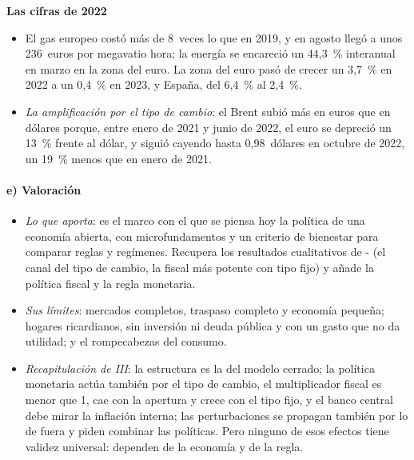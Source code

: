 \documentclass[11pt]{article}
\begin{document}
\begin{anotaciones}
\textbf{Las cifras de 2022}
\begin{itemize}
\item El gas europeo costó más de 8~veces lo que en 2019, y en agosto llegó a unos 236~euros por megavatio hora\nocite{BancoMundial2026PinkSheet}; la energía se encareció un 44,3~\% interanual en marzo en la zona del euro\nocite{Eurostat2026IAPC}. La zona del euro pasó de crecer un 3,7~\% en 2022 a un 0,4~\% en 2023, y España, del 6,4~\% al 2,4~\%\nocite{Eurostat2026nama10gdp,INE2026CNA2025}.
\item \emph{La amplificación por el tipo de cambio}: el Brent subió más en euros que en dólares\nocite{EIA2026Brent} porque, entre enero de 2021 y junio de 2022, el euro se depreció un 13~\% frente al dólar, y siguió cayendo hasta 0,98~dólares en octubre de 2022, un 19~\% menos que en enero de 2021\nocite{BCE2026EXR}.
\end{itemize}
\begin{figuracaja}
\centering
\caption{El petróleo en dólares y en euros y el tipo de cambio del euro, 2019-2026}\label{fig:energia-tipo-cambio}
\end{figuracaja}
\end{anotaciones}

\paragraph{e) Valoración}

\begin{itemize}
\item \emph{Lo que aporta}: es el marco con el que se piensa hoy la política de una economía abierta, con microfundamentos y un criterio de bienestar para comparar reglas y regímenes. Recupera los resultados cualitativos de - (el canal del tipo de cambio, la fiscal más potente con tipo fijo) y añade la política fiscal y la regla monetaria.
\item \emph{Sus límites}: mercados completos, traspaso completo y economía pequeña; hogares ricardianos, sin inversión ni deuda pública y con un gasto que no da utilidad; y el rompecabezas del consumo.
\item \emph{Recapitulación de III}: la estructura es la del modelo cerrado; la política monetaria actúa también por el tipo de cambio, el multiplicador fiscal es menor que 1, cae con la apertura y crece con el tipo fijo, y el banco central debe mirar la inflación interna; las perturbaciones se propagan también por lo de fuera y piden combinar las políticas. Pero ninguno de esos efectos tiene validez universal: dependen de la economía y de la regla.
\end{itemize}
\end{document}
